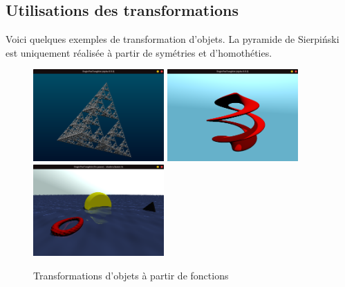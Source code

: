 \subsection{Utilisations des transformations}
Voici quelques exemples de transformation d'objets. La pyramide de Sierpiński est uniquement réalisée à partir de symétries et d'homothéties.
\begin{figure}[h]
    \centering
    \includegraphics[width=5cm]{images/screens/sierp.png}
    \includegraphics[width=5cm]{images/screens/modifier1.png}
    \includegraphics[width=5cm]{images/screens/modifier2.png}
    \caption{Transformations d'objets à partir de fonctions}
    \label{fig:ocean}
\end{figure}